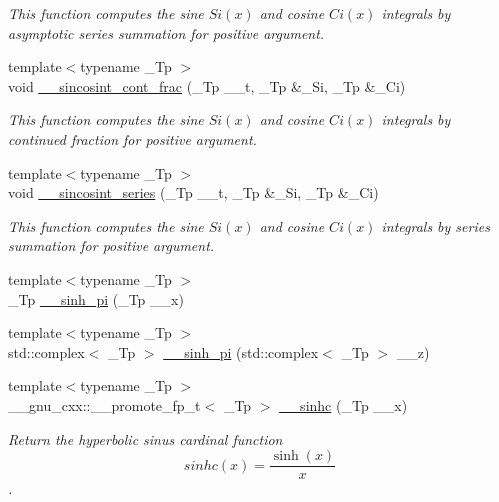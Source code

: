 \begin{DoxyCompactItemize}
\begin{DoxyCompactList}\small\item\em This function computes the sine $ Si(x) $ and cosine $ Ci(x) $ integrals by asymptotic series summation for positive argument. \end{DoxyCompactList}\item 
{\footnotesize template$<$typename \+\_\+\+Tp $>$ }\\void \hyperlink{namespacestd_1_1____detail_a211f552bca2944f64e3a1f5593690fda}{\+\_\+\+\_\+sincosint\+\_\+cont\+\_\+frac} (\+\_\+\+Tp \+\_\+\+\_\+t, \+\_\+\+Tp \&\+\_\+\+Si, \+\_\+\+Tp \&\+\_\+\+Ci)
\begin{DoxyCompactList}\small\item\em This function computes the sine $ Si(x) $ and cosine $ Ci(x) $ integrals by continued fraction for positive argument. \end{DoxyCompactList}\item 
{\footnotesize template$<$typename \+\_\+\+Tp $>$ }\\void \hyperlink{namespacestd_1_1____detail_aea85e0044476065ed4a067f1aa9647cb}{\+\_\+\+\_\+sincosint\+\_\+series} (\+\_\+\+Tp \+\_\+\+\_\+t, \+\_\+\+Tp \&\+\_\+\+Si, \+\_\+\+Tp \&\+\_\+\+Ci)
\begin{DoxyCompactList}\small\item\em This function computes the sine $ Si(x) $ and cosine $ Ci(x) $ integrals by series summation for positive argument. \end{DoxyCompactList}\item 
{\footnotesize template$<$typename \+\_\+\+Tp $>$ }\\\+\_\+\+Tp \hyperlink{namespacestd_1_1____detail_a6dd7153012cc7885e76a47a5162981da}{\+\_\+\+\_\+sinh\+\_\+pi} (\+\_\+\+Tp \+\_\+\+\_\+x)
\item 
{\footnotesize template$<$typename \+\_\+\+Tp $>$ }\\std\+::complex$<$ \+\_\+\+Tp $>$ \hyperlink{namespacestd_1_1____detail_aa8fe06b3d9584ea9c81b0349ba7eb2dc}{\+\_\+\+\_\+sinh\+\_\+pi} (std\+::complex$<$ \+\_\+\+Tp $>$ \+\_\+\+\_\+z)
\item 
{\footnotesize template$<$typename \+\_\+\+Tp $>$ }\\\+\_\+\+\_\+gnu\+\_\+cxx\+::\+\_\+\+\_\+promote\+\_\+fp\+\_\+t$<$ \+\_\+\+Tp $>$ \hyperlink{namespacestd_1_1____detail_a542bbc5f25643898444c02fbaec5c820}{\+\_\+\+\_\+sinhc} (\+\_\+\+Tp \+\_\+\+\_\+x)
\begin{DoxyCompactList}\small\item\em Return the hyperbolic sinus cardinal function \[ sinhc(x) = \frac{\sinh(x)}{x} \]. \end{DoxyCompactList}\item 

\end{DoxyCompactItemize}
